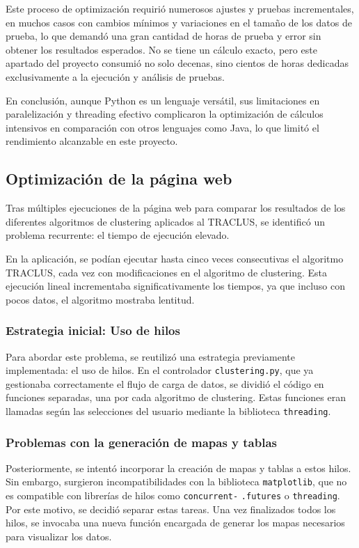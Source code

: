 Este proceso de optimización requirió numerosos ajustes y pruebas incrementales, en muchos casos con cambios mínimos y variaciones en el tamaño de los datos de prueba, lo que demandó una gran cantidad de horas de prueba y error sin obtener los resultados esperados. No se tiene un cálculo exacto, pero este apartado del proyecto consumió no solo decenas, sino cientos de horas dedicadas exclusivamente a la ejecución y análisis de pruebas.

En conclusión, aunque Python es un lenguaje versátil, sus limitaciones en paralelización y threading efectivo complicaron la optimización de cálculos intensivos en comparación con otros lenguajes como Java, lo que limitó el rendimiento alcanzable en este proyecto.


\subsection{Optimización de la página web} 

Tras múltiples ejecuciones de la página web para comparar los resultados de los diferentes algoritmos de clustering aplicados al TRACLUS, se identificó un problema recurrente: el tiempo de ejecución elevado.

En la aplicación, se podían ejecutar hasta cinco veces consecutivas el algoritmo TRACLUS, cada vez con modificaciones en el algoritmo de clustering. Esta ejecución lineal incrementaba significativamente los tiempos, ya que incluso con pocos datos, el algoritmo mostraba lentitud.

\subsubsection{Estrategia inicial: Uso de hilos}
Para abordar este problema, se reutilizó una estrategia previamente implementada: el uso de hilos. En el controlador \texttt{clustering.py}, que ya gestionaba correctamente el flujo de carga de datos, se dividió el código en funciones separadas, una por cada algoritmo de clustering. Estas funciones eran llamadas según las selecciones del usuario mediante la biblioteca \texttt{threading}.

\subsubsection{Problemas con la generación de mapas y tablas}
Posteriormente, se intentó incorporar la creación de mapas y tablas a estos hilos. Sin embargo, surgieron incompatibilidades con la biblioteca \texttt{matplotlib}, que no es compatible con librerías de hilos como \texttt{concurrent-} \texttt{.futures} o \texttt{threading}. Por este motivo, se decidió separar estas tareas. Una vez finalizados todos los hilos, se invocaba una nueva función encargada de generar los mapas necesarios para visualizar los datos.

